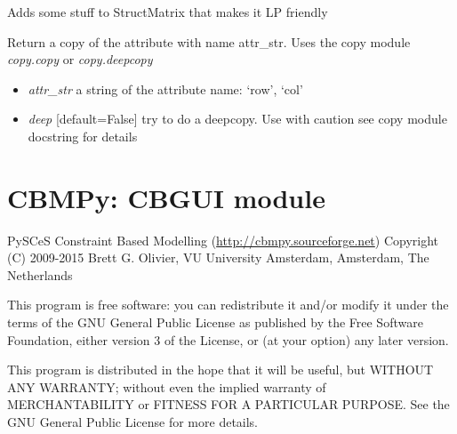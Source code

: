 \documentclass[a4paper,11pt,english]{sphinxmanual}
\begin{document}
\begin{fulllineitems}
\label{modules_doc:cbmpy.CBDataStruct.StructMatrixLP}
Adds some stuff to StructMatrix that makes it LP friendly

\begin{fulllineitems}
\label{modules_doc:cbmpy.CBDataStruct.StructMatrixLP.getCopy}
Return a copy of the attribute with name attr\_str. Uses the copy module \emph{copy.copy} or \emph{copy.deepcopy}
\begin{itemize}
\item {} 
\emph{attr\_str} a string of the attribute name: `row', `col'

\item {} 
\emph{deep} {[}default=False{]} try to do a deepcopy. Use with caution see copy module docstring for details

\end{itemize}

\end{fulllineitems}


\end{fulllineitems}

\label{modules_doc:module-cbmpy.CBGUI}

\section{CBMPy: CBGUI module}
\label{modules_doc:cbmpy-cbgui-module}
PySCeS Constraint Based Modelling (\href{http://cbmpy.sourceforge.net}{http://cbmpy.sourceforge.net})
Copyright (C) 2009-2015 Brett G. Olivier, VU University Amsterdam, Amsterdam, The Netherlands

This program is free software: you can redistribute it and/or modify
it under the terms of the GNU General Public License as published by
the Free Software Foundation, either version 3 of the License, or
(at your option) any later version.

This program is distributed in the hope that it will be useful,
but WITHOUT ANY WARRANTY; without even the implied warranty of
MERCHANTABILITY or FITNESS FOR A PARTICULAR PURPOSE.  See the
GNU General Public License for more details.
\end{document}

